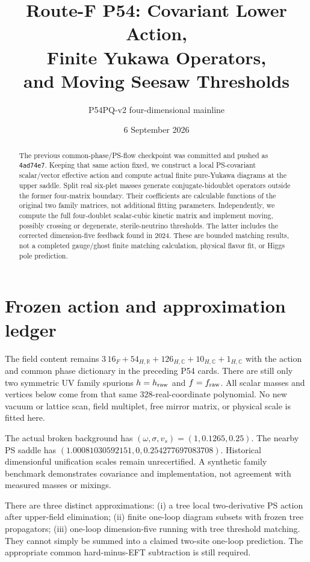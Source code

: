 \documentclass[11pt]{article}
\title{Route-F P54: Covariant Lower Action,\\Finite Yukawa Operators,\\and Moving Seesaw Thresholds}
\author{P54PQ-v2 four-dimensional mainline}
\date{6 September 2026}
\begin{document}
\maketitle
\begin{abstract}
The previous common-phase/PS-flow checkpoint was committed and pushed as
\texttt{4ad74e7}. Keeping that same action fixed, we construct a local
PS-covariant scalar/vector effective action and compute actual finite
pure-Yukawa diagrams at the upper saddle. Split real six-plet masses
generate conjugate-bidoublet operators outside the former four-matrix
boundary. Their coefficients are calculable functions of the original two
family matrices, not additional fitting parameters. Independently, we
compute the full four-doublet scalar-cubic kinetic matrix and implement
moving, possibly crossing or degenerate, sterile-neutrino thresholds.
The latter includes the corrected dimension-five feedback found in 2024.
These are bounded matching results, not a completed gauge/ghost finite
matching calculation, physical flavor fit, or Higgs pole prediction.
\end{abstract}
\tableofcontents
\clearpage

\section{Frozen action and approximation ledger}
The field content remains $3\,16_F+54_{H,\mathbb R}+126_{H,\mathbb C}
+10_{H,\mathbb C}+1_{H,\mathbb C}$ with the action and common phase
dictionary in the preceding P54 cards. There are still only two symmetric
UV family spurions $h=h_{\rm raw}$ and $f=f_{\rm raw}$. All scalar masses
and vertices below come from that same 328-real-coordinate polynomial.
No new vacuum or lattice scan, field multiplet, free mirror matrix, or
physical scale is fitted here.

The actual broken background has $(\omega,\sigma,v_s)=(1,0.1265,0.25)$.
The nearby PS saddle has $(1.00081030592151,0,0.254277697083708)$.
Historical dimensionful unification scales remain unrecertified. A
synthetic family benchmark demonstrates covariance and implementation,
not agreement with measured masses or mixings.

There are three distinct approximations: (i) a tree local two-derivative
PS action after upper-field elimination; (ii) finite one-loop diagram
subsets with frozen tree propagators; (iii) one-loop dimension-five
running with tree threshold matching. They cannot simply be summed into
a claimed two-site one-loop prediction. The appropriate common
hard-minus-EFT subtraction is still required.
\end{document}
